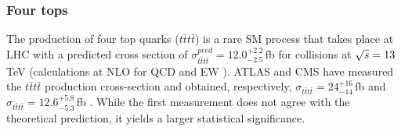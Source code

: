 \subsubsection{Four tops}
\label{sec:Chap1:Top:Production:4tops}
The production of four top quarks ($t\bar{t}t\bar{t}$) is a rare SM process that takes place at LHC 
with a predicted cross section of $\sigma^{pred}_{t\bar{t}t\bar{t}} = 12.0^{+2.2}_{-2.5}\,$fb for \Pproton\Pproton
collisions at $\sqrt{s}=13\,$TeV (calculations at NLO for QCD and EW \cite{Frederix:2017wme}). 
ATLAS and CMS have measured the $t\bar{t}t\bar{t}$ production cross-section and obtained,
respectively, $\sigma_{t\bar{t}t\bar{t}} = 24^{+16}_{-14}\,$fb \cite{ATLAS:2021kqb} and 
$\sigma_{t\bar{t}t\bar{t}} = 12.6^{+5.8}_{-5.3}\,$fb \cite{CMS:2019rvj}.
While the first measurement does not agree with the theoretical prediction, 
it yields a larger statistical significance. 

